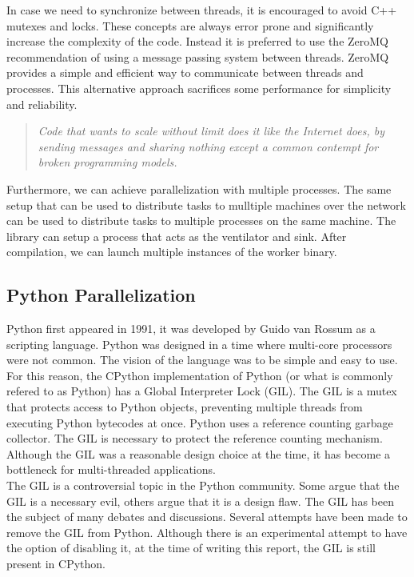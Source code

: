 \begin{spacing}{1.2}
    In case we need to synchronize between threads, it is encouraged to avoid C++ mutexes and locks.
    These concepts are always error prone and significantly increase the complexity of the code.
    Instead it is preferred to use the ZeroMQ recommendation of using a message passing system
    between threads. ZeroMQ provides a simple and efficient way to communicate between threads
    and processes. This alternative approach sacrifices some performance for simplicity and reliability.

    \begin{quote}
        \textit{Code that wants to scale without limit does it like the Internet does, by sending messages
            and sharing nothing except a common contempt for broken programming models.} \cite{hintjens2013zeromq}
    \end{quote}

    Furthermore, we can achieve parallelization with multiple processes. The same
    setup that can be used to distribute tasks to mulltiple machines over the network
    can be used to distribute tasks to multiple processes on the same machine.
    The library can setup a process that acts as the ventilator and sink. After compilation,
    we can launch multiple instances of the worker binary.

    \subsection{Python Parallelization}

    Python first appeared in 1991, it was developed by Guido van Rossum as a scripting language.
    Python was designed in a time where multi-core processors were not common. The vision
    of the language was to be simple and easy to use. For this reason, the CPython implementation
    of Python (or what is commonly refered to as Python) has a Global Interpreter Lock (GIL).
    The GIL is a mutex that protects access to Python objects, preventing multiple threads from executing
    Python bytecodes at once. Python uses a reference counting garbage collector. The GIL is necessary
    to protect the reference counting mechanism. Although the GIL was a reasonable design choice
    at the time, it has become a bottleneck for multi-threaded applications.\\

    The GIL is a controversial topic in the Python community. Some argue that the GIL is a necessary
    evil, others argue that it is a design flaw. The GIL has been the subject of many debates and discussions.
    Several attempts have been made to remove the GIL from Python. Although there is an
    experimental attempt to have the option of disabling it, at the time of writing
    this report, the GIL is still present in CPython.\\


\end{spacing}
